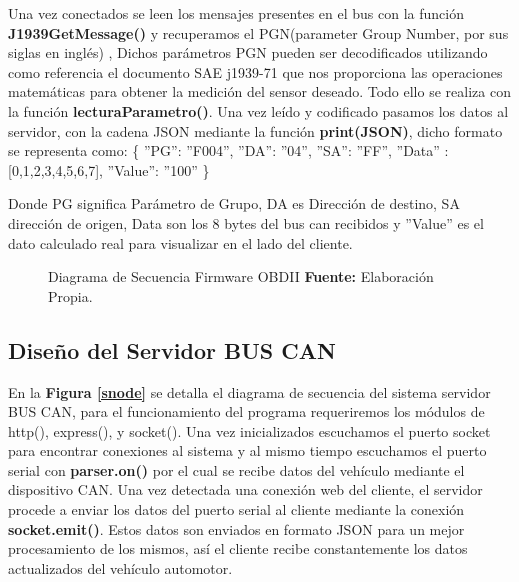 Una vez conectados se leen los mensajes presentes en el bus con la función {\bfseries J1939GetMessage()} y recuperamos el PGN(parameter Group Number, por sus siglas en inglés) , 
Dichos parámetros PGN pueden ser decodificados utilizando como referencia el documento SAE j1939-71 que nos proporciona las operaciones matemáticas para obtener la medición del sensor deseado.  Todo ello se realiza con la función {\bfseries lecturaParametro()}.
Una vez leído y codificado pasamos los datos al servidor, con la cadena JSON  mediante la función {\bfseries print(JSON)}, dicho formato se representa como: 
\{
''PG'': ''F004'',
''DA'':  ''04'',
''SA'':  ''FF'',
''Data'' : [0,1,2,3,4,5,6,7],
''Value'': ''100''
\}

Donde PG significa Parámetro de Grupo, DA es Dirección de destino, SA dirección de origen, Data son los 8 bytes del bus can recibidos y ''Value'' es el dato calculado real para visualizar en el lado del cliente.






\begin{figure}[H]
	\centering
	\begin{center}
		
	\end{center}
	\caption[Diagrama de Secuencia Firmware OBDII.]{Diagrama de Secuencia Firmware OBDII \textbf{ Fuente:} Elaboración Propia.}
	\label{sj} %
\end{figure}


\subsection{Diseño del Servidor BUS CAN}
En la \textbf{Figura \ref{snode}} se detalla el diagrama de secuencia del sistema servidor BUS CAN, para el funcionamiento del programa requeriremos los módulos de http(), express(), y socket(). Una vez inicializados escuchamos el puerto socket para encontrar conexiones al sistema y al mismo tiempo escuchamos el puerto serial con {\bfseries parser.on()} por el cual se recibe datos del vehículo mediante el dispositivo CAN. 
Una vez detectada una conexión web del cliente,  el servidor  procede a enviar los datos del puerto serial al cliente mediante la conexión  {\bfseries socket.emit()}. Estos datos son enviados en formato JSON para un mejor procesamiento de los mismos,  así el cliente recibe constantemente los datos actualizados del vehículo automotor. 

